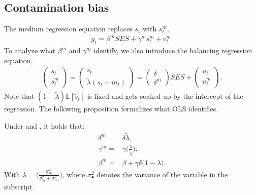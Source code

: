 \subsection{Contamination bias}

\noindent The medium regression equation replaces $s_t$ with $s^m_t$,
\begin{align} \label{eqn:med}
    y_{t}= \beta^m SES + \gamma^m s_{t}^m+e_{t}^m.
\end{align}
To analyze what $\beta^m$ and $\gamma^m$ identify, we also introduce the balancing regression equation,
\begin{align}\label{eqn:balancing}
 \begin{pmatrix} s_t \\ s_{t}^m  \end{pmatrix}= \begin{pmatrix} s_t \\ \widetilde{\lambda} (s_t+m_t)  \end{pmatrix}=\begin{pmatrix} \delta \\ \delta^{m}  \end{pmatrix} SES +  \begin{pmatrix} u_{t} \\ u^m_{t} \end{pmatrix}.
\end{align} 
Note that $(1-\widetilde{\lambda} )\mathbb{E}[\widetilde{s}_t]$ is fixed and gets soaked up by the intercept of the regression. The following proposition formalizes what OLS identifies.
\begin{proposition}\label{prop:ols}
Under  and , it holds that: 
    \begin{align} 
    \label{eqn:deltam_ass}
    \delta^m=&\delta \widetilde{\lambda}, \\\label{eqn:gammam_ass}
    \gamma^m=&\gamma \Bigg(\frac{\lambda}{\widetilde{\lambda}}\Bigg), \\  
    \label{eqn:betam_ass}
    \beta^{m}=&\beta+\gamma\delta\big(1-\lambda\big).
    \end{align}    
With $\lambda=\Bigg(\frac{\sigma_{u_{t}}^2}{\sigma_{u_{t}}^2+\sigma_{m_{t}}^2} \Bigg)$, where $\sigma_{\bullet}^2$ denotes the variance of the variable in the subscript.
\end{proposition}

